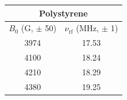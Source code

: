 \begin{tabular}{cc}
\hline
\multicolumn{2}{c}{Polystyrene} \\
\hline
$B_0$ (G, $\pm$ 50) & $\nu_{\mathrm{rf}}$ (MHz, $\pm$ 1) \\
\hline
3974 & 17.53 \\
4100 & 18.24 \\
4210 & 18.29 \\
4380 & 19.25 \\
\hline
\end{tabular}
